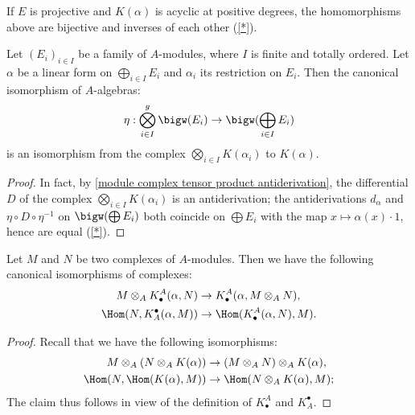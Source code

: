 If $E$ is projective and $K(\alpha)$ is acyclic at positive degrees, the homomorphisms above are bijective and inverses of each other (\cref{*}).
\begin{proposition}\label{Koszul complex finite direct sum iso}
Let $(E_i)_{i\in I}$ be a family of $A$-modules, where $I$ is finite and totally ordered. Let $\alpha$ be a linear form on $\bigoplus_{i\in I}E_i$ and $\alpha_i$ its restriction on $E_i$. Then the canonical isomorphism of $A$-algebras:
\[\eta:\bigotimes_{i\in I}^{g}\bigw(E_i)\to\bigw(\bigoplus_{i\in I}E_i)\]
is an isomorphism from the complex $\bigotimes_{i\in I}K(\alpha_i)$ to $K(\alpha)$.
\end{proposition}
\begin{proof}
In fact, by \cref{module complex tensor product antiderivation}, the differential $D$ of the complex $\bigotimes_{i\in I}K(\alpha_i)$ is an antiderivation; the antiderivations $d_\alpha$ and $\eta\circ D\circ\eta^{-1}$ on $\bigw(\bigoplus E_i)$ both coincide on $\bigoplus E_i$ with the map $x\mapsto\alpha(x)\cdot 1$, hence are equal (\cref{*}). 
\end{proof}
\begin{proposition}\label{Koszul complex two module iso}
Let $M$ and $N$ be two complexes of $A$-modules. Then we have the following canonical isomorphisms of complexes:
\begin{align}
M\otimes_AK^A_\bullet(\alpha,N)&\to K_\bullet^A(\alpha,M\otimes_A N),\label{Koszul complex two module iso-1}\\
\Hom(N,K^\bullet_A(\alpha,M))&\to\Hom(K_\bullet^A(\alpha,N),M).\label{Koszul complex two module iso-2}
\end{align}
\end{proposition}
\begin{proof}
Recall that we have the following isomorphisms:
\begin{align*}
M\otimes_A(N\otimes_AK(\alpha))&\to (M\otimes_AN)\otimes_AK(\alpha),\\
\Hom(N,\Hom(K(\alpha),M))&\to\Hom(N\otimes_AK(\alpha),M);
\end{align*}
The claim thus follows in view of the definition of $K_\bullet^A$ and $K^\bullet_A$.
\end{proof}

